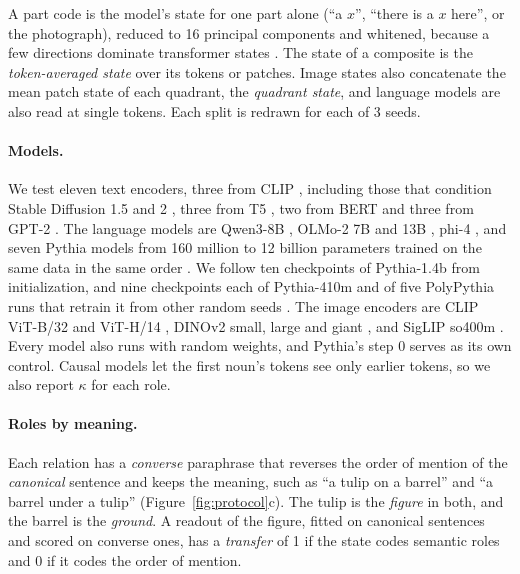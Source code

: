 \documentclass[10pt]{article}
\theoremstyle{plain}
\theoremstyle{remark}
\begin{document}
A part code is the model's state for one part alone (``a $x$'', ``there is a $x$ here'', or the photograph), reduced to 16 principal components and whitened, because a few directions dominate transformer states \citep{timkey2021}. The state of a composite is the \emph{token-averaged state} over its tokens or patches. Image states also concatenate the mean patch state of each quadrant, the \emph{quadrant state}, and language models are also read at single tokens. Each split is redrawn for each of 3 seeds.

\paragraph{Models.} We test eleven text encoders, three from CLIP \citep{radford2021clip}, including those that condition Stable Diffusion 1.5 and 2 \citep{rombach2022}, three from T5 \citep{raffel2020t5}, two from BERT \citep{devlin2019bert} and three from GPT-2 \citep{radford2019gpt2}. The language models are Qwen3-8B \citep{yang2025qwen3}, OLMo-2 7B and 13B \citep{olmo2024olmo2}, phi-4 \citep{abdin2024phi4}, and seven Pythia models from 160 million to 12 billion parameters trained on the same data in the same order \citep{biderman2023pythia}. We follow ten checkpoints of Pythia-1.4b from initialization, and nine checkpoints each of Pythia-410m and of five PolyPythia runs that retrain it from other random seeds \citep{vanderwal2025polypythias}. The image encoders are CLIP ViT-B/32 and ViT-H/14 \citep{radford2021clip,cherti2023}, DINOv2 small, large and giant \citep{oquab2024dinov2}, and SigLIP so400m \citep{zhai2023siglip}. Every model also runs with random weights, and Pythia's step 0 serves as its own control. Causal models let the first noun's tokens see only earlier tokens, so we also report $\kappa$ for each role.

\paragraph{Roles by meaning.} Each relation has a \emph{converse} paraphrase that reverses the order of mention of the \emph{canonical} sentence and keeps the meaning, such as ``a tulip on a barrel'' and ``a barrel under a tulip'' (Figure~\ref{fig:protocol}c). The tulip is the \emph{figure} in both, and the barrel is the \emph{ground}. A readout of the figure, fitted on canonical sentences and scored on converse ones, has a \emph{transfer} of 1 if the state codes semantic roles and 0 if it codes the order of mention.
\end{document}
